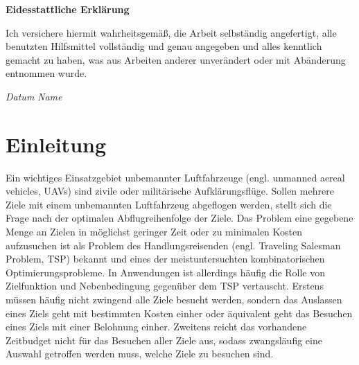 \documentclass[12pt,a4paper,twoside]{article}
\theoremstyle{definition}
\numberwithin{equation}{section}
\begin{document}
\cleardoublepage
\vspace*{1cm}

{\Large \textbf{Eidesstattliche Erklärung}} 

\bigskip

Ich versichere hiermit wahrheitsgemäß, die Arbeit selbständig angefertigt, alle benutzten Hilfsmittel vollständig und genau angegeben und alles kenntlich gemacht zu haben, was aus Arbeiten anderer unverändert oder mit Abänderung entnommen wurde.\\
\vspace{1cm}

\textit{Datum} \hspace{8cm} \textit{Name}

\cleardoublepage
\rmfamily \pagestyle{fancy}
\renewcommand{\sectionmark}[1]{\markright{\thesection\ #1}}
\setcounter{secnumdepth}{4}
 \setcounter{page}{3} 
\tableofcontents
{} \setcounter{roemisch}{\value{page}}
\clearpage
\mbox{}\thispagestyle{empty}\clearpage
\setcounter{page}{2} 
\section{Einleitung}\label{section:introduction}
Ein wichtiges Einsatzgebiet unbemannter Luftfahrzeuge (engl. unmanned aereal vehicles, UAVs) sind zivile oder militärische Aufklärungsflüge. Sollen mehrere Ziele mit einem unbemannten Luftfahrzeug abgeflogen werden, stellt sich die Frage nach der optimalen Abflugreihenfolge der Ziele. Das Problem eine gegebene Menge an Zielen in möglichst geringer Zeit oder zu minimalen Kosten aufzusuchen ist als Problem des Handlungsreisenden (engl. Traveling Salesman Problem, TSP) bekannt und eines der meistuntersuchten kombinatorischen Optimierungsprobleme. In Anwendungen ist allerdings häufig die Rolle von Zielfunktion und Nebenbedingung gegenüber dem TSP vertauscht. Erstens müssen häufig nicht zwingend alle Ziele besucht werden, sondern das Auslassen eines Ziels geht mit bestimmten Kosten einher oder äquivalent geht das Besuchen eines Ziels mit einer Belohnung einher. Zweitens reicht das vorhandene Zeitbudget nicht für das Besuchen aller Ziele aus, sodass zwangsläufig eine Auswahl getroffen werden muss, welche Ziele zu besuchen sind.\\
\end{document}
